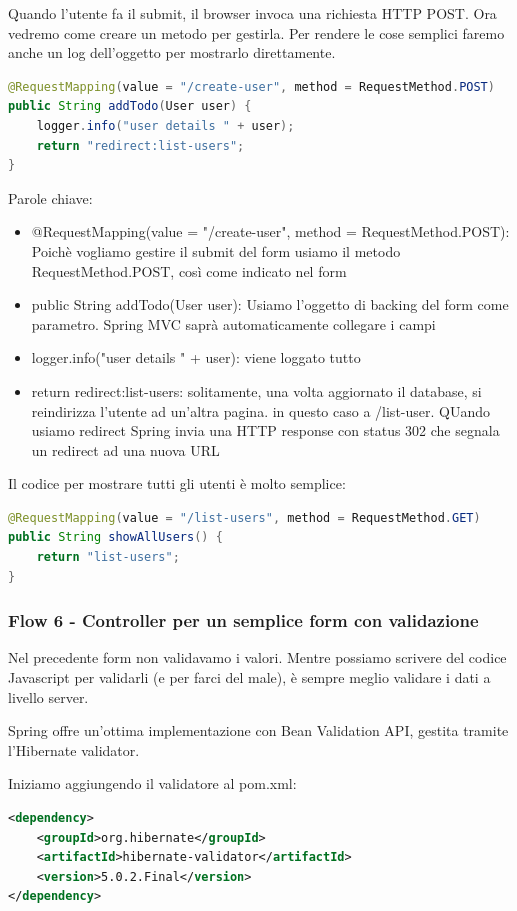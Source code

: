 \documentclass[11pt,a4paper]{book}
\begin{document}
Quando l'utente fa il submit, il browser invoca una richiesta HTTP POST. Ora vedremo come creare un metodo per gestirla. Per rendere le cose semplici faremo anche un log dell'oggetto per mostrarlo direttamente.
\begin{lstlisting}[language = Java]
@RequestMapping(value = "/create-user", method = RequestMethod.POST)
public String addTodo(User user) {
	logger.info("user details " + user);
	return "redirect:list-users";
}
\end{lstlisting}
Parole chiave:
\begin{itemize}
	\item @RequestMapping(value = "/create-user", method = RequestMethod.POST): Poichè vogliamo gestire il submit del form usiamo il metodo RequestMethod.POST, così come indicato nel form
	\item public String addTodo(User user): Usiamo l'oggetto di backing del form come parametro. Spring MVC saprà automaticamente collegare i campi
	\item logger.info("user details " + user): viene loggato tutto
	\item return redirect:list-users: solitamente, una volta aggiornato il database, si reindirizza l'utente ad un'altra pagina. in questo caso a /list-user. QUando usiamo redirect Spring invia una HTTP response con status 302 che segnala un redirect ad una nuova URL
\end{itemize}

Il codice per mostrare tutti gli utenti è molto semplice:
\begin{lstlisting}[language = Java]
@RequestMapping(value = "/list-users", method = RequestMethod.GET)
public String showAllUsers() {
	return "list-users";
}
\end{lstlisting}

\subsubsection{Flow 6 - Controller per un semplice form con validazione} \label{flow6}
Nel precedente form non validavamo i valori. Mentre possiamo scrivere del codice Javascript per validarli (e per farci del male), è sempre meglio validare i dati a livello server.

Spring offre un'ottima implementazione con Bean Validation API, gestita tramite l'Hibernate validator.

Iniziamo aggiungendo il validatore al pom.xml:
\begin{lstlisting}[language = XML]
<dependency>
	<groupId>org.hibernate</groupId>
	<artifactId>hibernate-validator</artifactId>
	<version>5.0.2.Final</version>
</dependency>
\end{lstlisting}
\end{document}
